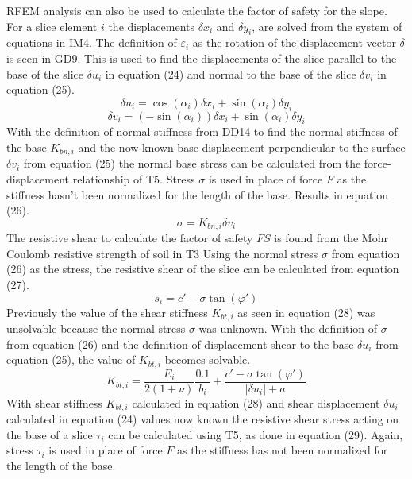 \documentclass[12pt]{article}
\begin{document}
RFEM analysis can also be used to calculate the factor of safety for the slope. For a slice element $i$ the displacements $\delta{}x_{i}$ and $\delta{}y_{i}$, are solved from the system of equations in IM4. The definition of $\varepsilon{}_{i}$ as the rotation of the displacement vector $\delta{}$ is seen in GD9. This is used to find the displacements of the slice parallel to the base of the slice $\delta{}u_{i}$ in equation (24) and normal to the base of the slice $\delta{}v_{i}$ in equation (25).
\begin{equation}
\delta{}u_{i}=\cos\left(\alpha{}_{i}\right)\delta{}x_{i}+\sin\left(\alpha{}_{i}\right)\delta{}y_{i}
\end{equation}
\begin{equation}
\delta{}v_{i}=\left(-\sin\left(\alpha{}_{i}\right)\right)\delta{}x_{i}+\sin\left(\alpha{}_{i}\right)\delta{}y_{i}
\end{equation}
With the definition of normal stiffness from DD14 to find the normal stiffness of the base $K_{bn,i}$ and the now known base displacement perpendicular to the surface $\delta{}v_{i}$ from equation (25) the normal base stress can be calculated from the force-displacement relationship of T5. Stress $\sigma{}$ is used in place of force $F$ as the stiffness hasn't been normalized for the length of the base. Results in equation (26).
\begin{equation}
\sigma{}=K_{bn,i}\delta{}v_{i}
\end{equation}
The resistive shear to calculate the factor of safety $FS$ is found from the Mohr Coulomb resistive strength of soil in T3 Using the normal stress $\sigma{}$ from equation (26) as the stress, the resistive shear of the slice can be calculated from equation (27).
\begin{equation}
s_{i}=c'-\sigma{}\tan\left(\varphi{}'\right)
\end{equation}
Previously the value of the shear stiffness $K_{bt,i}$ as seen in equation (28) was unsolvable because the normal stress $\sigma{}$ was unknown. With the definition of $\sigma{}$ from equation (26) and the definition of displacement shear to the base $\delta{}u_{i}$ from equation (25), the value of $K_{bt,i}$ becomes solvable.
\begin{equation}
K_{bt,i}=\frac{E_{i}}{2\left(1+\nu{}\right)}\frac{0.1}{b_{i}}+\frac{c'-\sigma{}\tan\left(\varphi{}'\right)}{|\delta{}u_{i}|+a}
\end{equation}
With shear stiffness $K_{bt,i}$ calculated in equation (28) and shear displacement $\delta{}u_{i}$ calculated in equation (24) values now known the resistive shear stress acting on the base of a slice $\tau{}_{i}$ can be calculated using T5, as done in equation (29). Again, stress $\tau{}_{i}$ is used in place of force $F$ as the stiffness has not been normalized for the length of the base.
\end{document}
